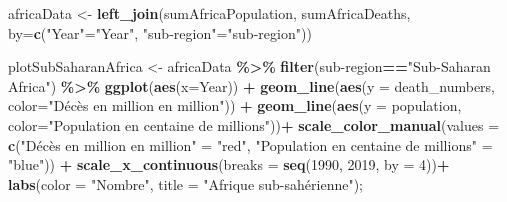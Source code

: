 \documentclass[
]{article}
\newenvironment{Shaded}{\begin{snugshade}}{\end{snugshade}}
\newcommand{\AttributeTok}[1]{\textcolor[rgb]{0.13,0.29,0.53}{#1}}
\newcommand{\DecValTok}[1]{\textcolor[rgb]{0.00,0.00,0.81}{#1}}
\newcommand{\FunctionTok}[1]{\textcolor[rgb]{0.13,0.29,0.53}{\textbf{#1}}}
\newcommand{\NormalTok}[1]{#1}
\newcommand{\OtherTok}[1]{\textcolor[rgb]{0.56,0.35,0.01}{#1}}
\newcommand{\SpecialCharTok}[1]{\textcolor[rgb]{0.81,0.36,0.00}{\textbf{#1}}}
\newcommand{\StringTok}[1]{\textcolor[rgb]{0.31,0.60,0.02}{#1}}
\begin{document}
\begin{Shaded}
\begin{Highlighting}[]
\NormalTok{africaData }\OtherTok{\textless{}{-}} \FunctionTok{left\_join}\NormalTok{(sumAfricaPopulation, sumAfricaDeaths, }\AttributeTok{by=}\FunctionTok{c}\NormalTok{(}\StringTok{"Year"}\OtherTok{=}\StringTok{"Year"}\NormalTok{, }\StringTok{"sub{-}region"}\OtherTok{=}\StringTok{"sub{-}region"}\NormalTok{))}

\NormalTok{plotSubSaharanAfrica }\OtherTok{\textless{}{-}}\NormalTok{ africaData }\SpecialCharTok{\%\textgreater{}\%}
  \FunctionTok{filter}\NormalTok{(}\StringTok{\textasciigrave{}}\AttributeTok{sub{-}region}\StringTok{\textasciigrave{}}\SpecialCharTok{==}\StringTok{"Sub{-}Saharan Africa"}\NormalTok{) }\SpecialCharTok{\%\textgreater{}\%}
  \FunctionTok{ggplot}\NormalTok{(}\FunctionTok{aes}\NormalTok{(}\AttributeTok{x=}\NormalTok{Year)) }\SpecialCharTok{+} 
  \FunctionTok{geom\_line}\NormalTok{(}\FunctionTok{aes}\NormalTok{(}\AttributeTok{y =}\NormalTok{ death\_numbers, }\AttributeTok{color=}\StringTok{"Décès en million en million"}\NormalTok{)) }\SpecialCharTok{+}
  \FunctionTok{geom\_line}\NormalTok{(}\FunctionTok{aes}\NormalTok{(}\AttributeTok{y =}\NormalTok{ population, }\AttributeTok{color=}\StringTok{"Population en centaine de millions"}\NormalTok{))}\SpecialCharTok{+}
  \FunctionTok{scale\_color\_manual}\NormalTok{(}\AttributeTok{values =} \FunctionTok{c}\NormalTok{(}\StringTok{"Décès en million en million"} \OtherTok{=} \StringTok{"red"}\NormalTok{, }\StringTok{"Population en centaine de millions"} \OtherTok{=} \StringTok{"blue"}\NormalTok{)) }\SpecialCharTok{+}
  \FunctionTok{scale\_x\_continuous}\NormalTok{(}\AttributeTok{breaks =} \FunctionTok{seq}\NormalTok{(}\DecValTok{1990}\NormalTok{, }\DecValTok{2019}\NormalTok{, }\AttributeTok{by =} \DecValTok{4}\NormalTok{))}\SpecialCharTok{+}
  \FunctionTok{labs}\NormalTok{(}\AttributeTok{color =} \StringTok{"Nombre"}\NormalTok{, }\AttributeTok{title =} \StringTok{"Afrique sub{-}sahérienne"}\NormalTok{);}


\end{Highlighting}
\end{Shaded}
\end{document}

